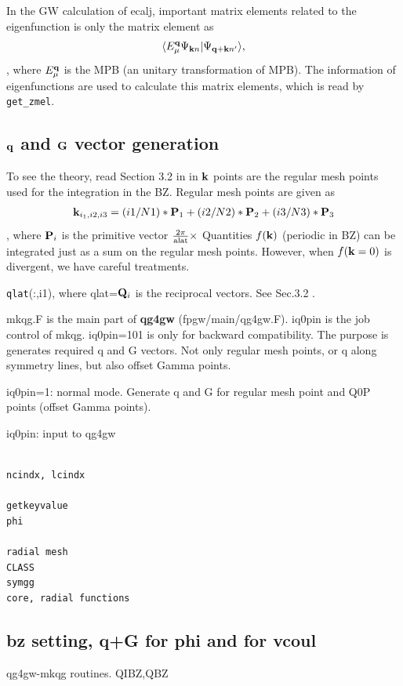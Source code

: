 \documentclass[a4paper,10pt,epsf,fleqn]{article}
\def\bfP{{\bf P}}
\newcommand{\bfq}{{\bf q}}
\newcommand{\bfk}{{\bf k}}
\newcommand{\bfQ}{{\bf Q}}
\newcommand{\bfG}{{\bf G}}
\newcommand{\exe}[1]{{\bf #1}}
\newcommand{\raw}[1]{{\tt #1}}
\newcommand{\qlat}{{\raw{qlat}}}
\begin{document}
In the GW calculation of ecalj, important matrix elements related
to the eigenfunction is only the matrix element as
\begin{eqnarray}
\langle E^{\bf q}_\mu \Psi_{{\bf k}n} |\Psi_{{\bf q+k}n'} \rangle,
\end{eqnarray}
, where $E^{\bf q}_\mu$ is the MPB (an unitary transformation of MPB).
The information of eigenfunctions are used to calculate this matrix elements, which is read by \verb#get_zmel#.

\subsection{$\bfq$ and $\bfG$ vector generation}
To see the theory, read Section 3.2 in in \cite{kotani_quasiparticle_2014}
$\bfk$ points are the regular mesh points used for the integration
in the BZ. Regular mesh points are given as
\begin{eqnarray}
\bfk_{i_1,i2,i3}=(i1/N1)*\bfP_1+(i2/N2)*\bfP_2+(i3/N3)*\bfP_3
\end{eqnarray}
, where $\bfP_i$ is the primitive vector $\frac{2\pi}{\rm alat} \times$
Quantities $f(\bfk)$ (periodic in BZ) can
be integrated just as a sum on the regular mesh points.
However, when  $f(\bfk=0)$ is divergent, we have careful treatments.

 


\qlat(:,i1), where qlat=$\bfQ_i$ is the reciprocal vectors.
See Sec.3.2 .



mkqg.F is the main part of \exe{qg4gw} (fpgw/main/qg4gw.F).
iq0pin is the job control of mkqg. iq0pin=101 is only for backward compatibility. 
The purpose is generates required q and G vectors.
Not only regular mesh points, or q along symmetry lines, 
but also offset Gamma points.



iq0pin=1: normal mode. Generate q and G for regular mesh point and Q0P
points (offset Gamma points).


iq0pin: input to qg4gw

\begin{verbatim}

ncindx, lcindx

getkeyvalue
phi

radial mesh
CLASS
symgg
core, radial functions

\end{verbatim}

\subsection{bz setting, q+G for phi and for vcoul}
qg4gw-mkqg routines.
QIBZ,QBZ 
\end{document}

